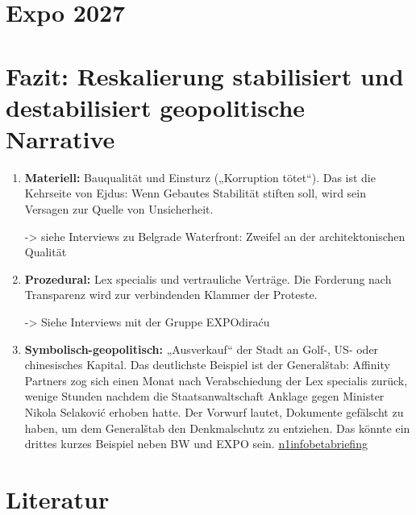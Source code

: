 \documentclass[
  ngerman,
]{agujournal2019}
\begin{document}
\section{Expo 2027}\label{expo-2027}

\section{Fazit: Reskalierung stabilisiert und destabilisiert
geopolitische
Narrative}\label{fazit-reskalierung-stabilisiert-und-destabilisiert-geopolitische-narrative}

\begin{enumerate}
\def\labelenumi{\arabic{enumi}.}
\item
  \textbf{Materiell:} Bauqualität und Einsturz („Korruption tötet``).
  Das ist die Kehrseite von Ejdus: Wenn Gebautes Stabilität stiften
  soll, wird sein Versagen zur Quelle von Unsicherheit.

  -\textgreater{} siehe Interviews zu Belgrade Waterfront: Zweifel an
  der architektonischen Qualität
\item
  \textbf{Prozedural:} Lex specialis und vertrauliche Verträge. Die
  Forderung nach Transparenz wird zur verbindenden Klammer der Proteste.

  -\textgreater{} Siehe Interviews mit der Gruppe EXPOdiraću
\item
  \textbf{Symbolisch-geopolitisch:} „Ausverkauf`` der Stadt an Golf-,
  US- oder chinesisches Kapital. Das deutlichste Beispiel ist der
  Generalštab: Affinity Partners zog sich einen Monat nach
  Verabschiedung der Lex specialis zurück, wenige Stunden nachdem die
  Staatsanwaltschaft Anklage gegen Minister Nikola Selaković erhoben
  hatte. Der Vorwurf lautet, Dokumente gefälscht zu haben, um dem
  Generalštab den Denkmalschutz zu entziehen. Das könnte ein drittes
  kurzes Beispiel neben BW und EXPO sein.
  \href{https://n1info.rs/vesti/zdravko-ponos-generalstab-kusner-projekt-donald-tramp-interesi/}{n1info}\href{https://betabriefing.com/news/politics/33447-wsj-after-backlash-jared-kushner-drops-plan-to-build-a-trump-hotel-in-serbia}{betabriefing}
\end{enumerate}

\section*{Literatur}\label{literatur}
\end{document}
